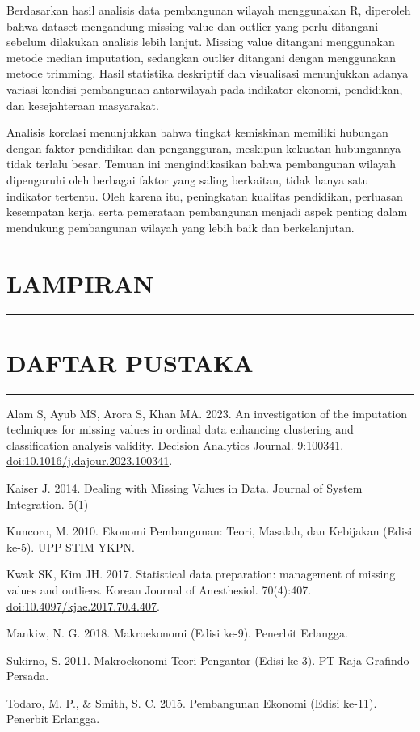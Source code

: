 \documentclass[
]{article}
\begin{document}
Berdasarkan hasil analisis data pembangunan wilayah menggunakan R,
diperoleh bahwa dataset mengandung missing value dan outlier yang perlu
ditangani sebelum dilakukan analisis lebih lanjut. Missing value
ditangani menggunakan metode median imputation, sedangkan outlier
ditangani dengan menggunakan metode trimming. Hasil statistika
deskriptif dan visualisasi menunjukkan adanya variasi kondisi
pembangunan antarwilayah pada indikator ekonomi, pendidikan, dan
kesejahteraan masyarakat.

Analisis korelasi menunjukkan bahwa tingkat kemiskinan memiliki hubungan
dengan faktor pendidikan dan pengangguran, meskipun kekuatan hubungannya
tidak terlalu besar. Temuan ini mengindikasikan bahwa pembangunan
wilayah dipengaruhi oleh berbagai faktor yang saling berkaitan, tidak
hanya satu indikator tertentu. Oleh karena itu, peningkatan kualitas
pendidikan, perluasan kesempatan kerja, serta pemerataan pembangunan
menjadi aspek penting dalam mendukung pembangunan wilayah yang lebih
baik dan berkelanjutan.

\section{LAMPIRAN}\label{lampiran}

\begin{center}\rule{0.5\linewidth}{0.5pt}\end{center}

\section{DAFTAR PUSTAKA}\label{daftar-pustaka}

\begin{center}\rule{0.5\linewidth}{0.5pt}\end{center}

Alam S, Ayub MS, Arora S, Khan MA. 2023. An investigation of the
imputation techniques for missing values in ordinal data enhancing
clustering and classification analysis validity. Decision Analytics
Journal. 9:100341. \url{doi:10.1016/j.dajour.2023.100341}.

Kaiser J. 2014. Dealing with Missing Values in Data. Journal of System
Integration. 5(1)

Kuncoro, M. 2010. Ekonomi Pembangunan: Teori, Masalah, dan Kebijakan
(Edisi ke-5). UPP STIM YKPN.

Kwak SK, Kim JH. 2017. Statistical data preparation: management of
missing values and outliers. Korean Journal of Anesthesiol. 70(4):407.
\url{doi:10.4097/kjae.2017.70.4.407}.

Mankiw, N. G. 2018. Makroekonomi (Edisi ke-9). Penerbit Erlangga.

Sukirno, S. 2011. Makroekonomi Teori Pengantar (Edisi ke-3). PT Raja
Grafindo Persada.

Todaro, M. P., \& Smith, S. C. 2015. Pembangunan Ekonomi (Edisi ke-11).
Penerbit Erlangga.
\end{document}
